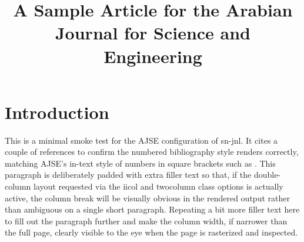 \documentclass[pdflatex,sn-basic,Numbered,iicol,twocolumn]{sn-jnl}
\begin{document}
\title[Article Title]{A Sample Article for the Arabian Journal for Science and Engineering}

\author*[1]{ }




\maketitle

\section{Introduction}\label{sec1}

This is a minimal smoke test for the AJSE configuration of sn-jnl. It cites
a couple of references \cite{article1,article2} to confirm the numbered
bibliography style renders correctly, matching AJSE's in-text style of
numbers in square brackets such as \cite{article1,article2}. This paragraph
is deliberately padded with extra filler text so that, if the double-column
layout requested via the iicol and twocolumn class options is actually
active, the column break will be visually obvious in the rendered output
rather than ambiguous on a single short paragraph. Repeating a bit more
filler text here to fill out the paragraph further and make the column
width, if narrower than the full page, clearly visible to the eye when the
page is rasterized and inspected.


\end{document}
